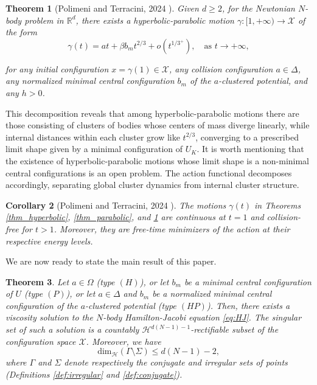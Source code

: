 \documentclass[a4paper,10pt]{amsart}
\theoremstyle{plain}
\newtheorem{thm}{Theorem}
\newtheorem{cor}[thm]{Corollary}
\theoremstyle{definition}
\numberwithin{equation}{section}
\numberwithin{thm}{section}
\begin{document}
\begin{thm}[Polimeni and Terracini, 2024 \cite{PolimeniTerracini}]\label{thm_partially_hyperbolic}
    Given $d \geq 2$, for the Newtonian $N$-body problem in $\mathbb{R}^d$, there exists a hyperbolic-parabolic motion $\gamma : [1,+\infty) \to \mathcal{X}$ of the form
    \begin{equation}\label{eq:hyperbolic_parabolic}
           \gamma(t) = at + \beta b_m t^{2/3} + o(t^{1/3^+}), \quad \text{as } t \to +\infty,
    \end{equation}
    
    for any initial configuration $x = \gamma(1) \in \mathcal{X}$, any collision configuration $a \in \Delta$, any normalized minimal central configuration $b_m$ of the $a$-clustered potential, and any $h > 0$.
\end{thm}

This decomposition {reveals} that among hyperbolic-parabolic motions there are those consisting of clusters of bodies whose centers of mass diverge linearly, while internal distances within each cluster grow like $t^{2/3}$, converging to a prescribed limit shape given by a minimal configuration of $U_K$. It is worth mentioning that the existence of hyperbolic-parabolic motions whose limit shape is a non-minimal central configurations is an open problem. The action functional decomposes accordingly, separating global cluster dynamics from internal cluster structure.

\begin{cor}[Polimeni and Terracini, 2024 \cite{PolimeniTerracini}]
    The motions $\gamma(t)$ in Theorems \ref{thm_hyperbolic}, \ref{thm_parabolic}, and \ref{thm_partially_hyperbolic} are continuous at $t = 1$ and collision-free for $t > 1$. Moreover, they are free-time minimizers of the action at their respective energy levels.
\end{cor}

We are now ready to state the main result of this paper.

\begin{thm}
    Let $a \in \Omega$ (type $(H)$), or let $b_m$ be a minimal central configuration of $U$ (type $(P)$), or let $a \in \Delta$ and $b_m$ be a normalized minimal central configuration of the $a$-clustered potential (type $(HP)$). Then, there exists a viscosity solution to the $N$-body Hamilton-Jacobi equation \eqref{eq:HJ}. The singular set of such a solution is a countably $\mathcal{H}^{d(N-1)-1}$-rectifiable subset of the configuration space $\mathcal{X}$. Moreover, we have
    \[
\mathrm{dim}_{\mathcal H}(\Gamma \setminus \Sigma) \le d(N-1)-2, 
\]
where $\Gamma$ and $\Sigma$ denote respectively the conjugate and irregular sets of points (Definitions \ref{def:irregular} and \ref{def:conjugate}).

\end{thm}
\end{document}

